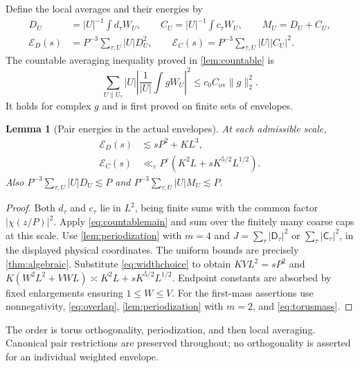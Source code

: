 \documentclass[11pt,reqno]{amsart}
\numberwithin{equation}{section}
\newtheorem{lemma}[lemma]{Lemma}
\theoremstyle{definition}
\theoremstyle{remark}
\newcommand{\eps}{\varepsilon}
\newcommand{\ED}{\mathcal E_D}
\newcommand{\EC}{\mathcal E_C}
\begin{document}
Define the local averages and their energies by
\begin{align}
 D_U&=|U|^{-1}\int d_\tau W_U,\qquad
 C_U=|U|^{-1}\int c_\tau W_U,\qquad M_U=D_U+C_U,
       \label{eq:DC}\\
 \ED(s)&=P^{-3}\sum_{\tau,U}|U|D_U^2,\qquad
 \EC(s)=P^{-3}\sum_{\tau,U}|U||C_U|^2.
       \label{eq:energies}
\end{align}
The countable averaging inequality proved in \cref{lem:countable} is
\begin{equation}\label{eq:countablemain}
 \sum_{U\parallel U_\tau}|U|
       \left|\frac1{|U|}\int gW_U\right|^2
 \le c_0C_{\mathrm{ov}}\|g\|_2^2.
\end{equation}
It holds for complex $g$ and is first proved on finite sets of envelopes.

\begin{lemma}[Pair energies in the actual envelopes]\label{lem:energy}
At each admissible scale,
\begin{align}
 \ED(s)&\lesssim sP^2+KL^3,\label{eq:EDarithmetic}\\
 \EC(s)&\ll_\eps P^\eps(K^2L+sK^{5/2}L^{1/2}).\label{eq:ECarithmetic}
\end{align}
Also $P^{-3}\sum_{\tau,U}|U|D_U\lesssim P$ and
$P^{-3}\sum_{\tau,U}|U|M_U\lesssim P$.
\end{lemma}
\begin{proof}
Both $d_\tau$ and $c_\tau$ lie in $L^2$, being finite sums with the common
factor $|\chi(z/P)|^2$. Apply \eqref{eq:countablemain} and sum over the finitely many coarse
caps at this scale. Use \cref{lem:periodization} with $m=4$ and
$J=\sum_\tau|\mathsf D_\tau|^2$ or $\sum_\tau|\mathsf C_\tau|^2$, in the displayed
physical coordinates. The uniform bounds are precisely \cref{thm:algebraic}.
Substitute \eqref{eq:widthchoice} to obtain
$KVL^2=sP^2$ and
$K(W^2L^2+VWL)\asymp K^2L+sK^{5/2}L^{1/2}$.
Endpoint constants are absorbed by fixed enlargements ensuring $1\le W\le V$.
For the first-mass assertions use nonnegativity, \eqref{eq:overlap},
\cref{lem:periodization} with $m=2$, and \eqref{eq:torusmass}.
\end{proof}
The order is torus orthogonality, periodization, and then local averaging.
Canonical pair restrictions are preserved throughout; no orthogonality is asserted for
an individual weighted envelope.
\end{document}
